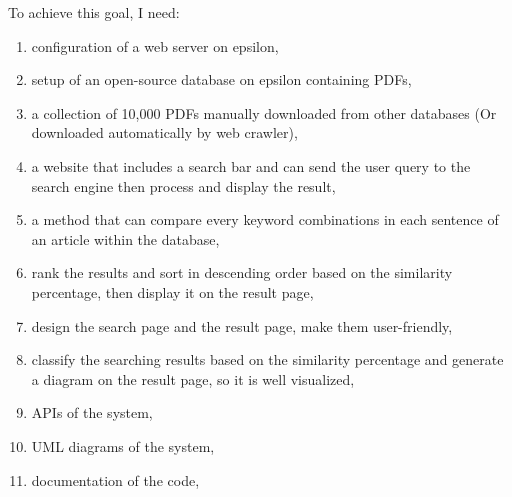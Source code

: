 
  To achieve this goal, I need:
\begin{enumerate}
  \item configuration of a web server on epsilon,
  \item setup of an open-source database on epsilon containing PDFs,
  \item a collection of 10,000 PDFs manually downloaded from other databases (Or downloaded automatically by web crawler),
  \item a website that includes a search bar and can send the user query to the search engine then process and display the result,
  \item a method that can compare every keyword combinations in each sentence of an article within the database,
  \item rank the results and sort in descending order based on the similarity percentage, then display it on the result page,
  \item design the search page and the result page, make them  user-friendly,
  \item classify the searching results based on the similarity percentage and generate a diagram on the result page, so it is well visualized,
  \item APIs of the system,
  \item UML diagrams of the system,
  \item documentation of the code, 
\end{enumerate}
